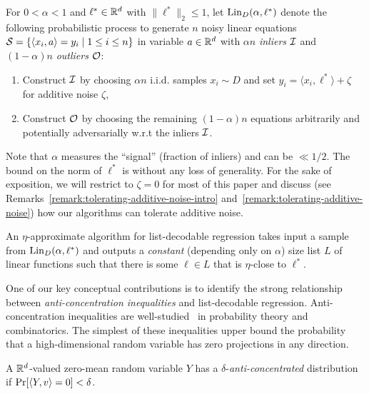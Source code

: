 \begin{model}
For $0 <\alpha < 1$ and $\ell^* \in \mathbb R^d$ with $\|\ell^*\|_2 \leq 1$, let $\mathrm{Lin}_D(\alpha,\ell^*)$ denote the following probabilistic process to generate $n$ noisy linear equations $\mathcal S = \{ \langle x_i, a \rangle = y_i\mid 1\leq i \leq n\}$ in variable $a \in \mathbb R^d$ with $\alpha n$ \emph{inliers} $\mathcal I$ and $(1-\alpha)n$ \emph{outliers} $\mathcal O$:
\begin{enumerate}
\item Construct $\mathcal I$ by choosing $\alpha n$ i.i.d. samples $x_i \sim D$ and set $y_i = \langle x_i,\ell^* \rangle + \zeta$ for additive noise $\zeta$,
\item Construct $\mathcal O$ by  choosing the remaining $(1-\alpha)n$ equations arbitrarily and potentially adversarially w.r.t the inliers $\mathcal I$.
\end{enumerate}
\label{model:random-equations}
\end{model}
Note that $\alpha$ measures the ``signal'' (fraction of inliers) and can be $\ll 1/2$. The bound on the norm of $\ell^*$ is without any loss of generality. For the sake of exposition, we will restrict to $\zeta = 0$ for most of this paper and discuss (see Remarks~\ref{remark:tolerating-additive-noise-intro} and~\ref{remark:tolerating-additive-noise})  how our algorithms can tolerate additive noise.


An $\eta$-approximate algorithm for list-decodable regression takes input a sample from $\mathrm{Lin}_D(\alpha,\ell^*)$ and outputs a \emph{constant} (depending only on $\alpha$) size list $L$ of linear functions such that there is some $\ell \in L$ that is $\eta$-close to $\ell^*$.

One of our key conceptual contributions is to identify the strong relationship between \emph{anti-concentration inequalities} and list-decodable regression. Anti-concentration inequalities are well-studied~\cite{ErdosLittlewoodOfford,MR2965282-Tao12,MR2407948-Rudelson08} in probability theory and combinatorics. The simplest of these inequalities upper bound the probability that a high-dimensional random variable has zero projections in any direction.

\begin{definition}
A $\mathbb R^d$-valued zero-mean random variable $Y$ has a $\delta$-\emph{anti-concentrated} distribution if $\Pr[ \langle Y,v\rangle=0 ]< \delta$. 
\end{definition}

